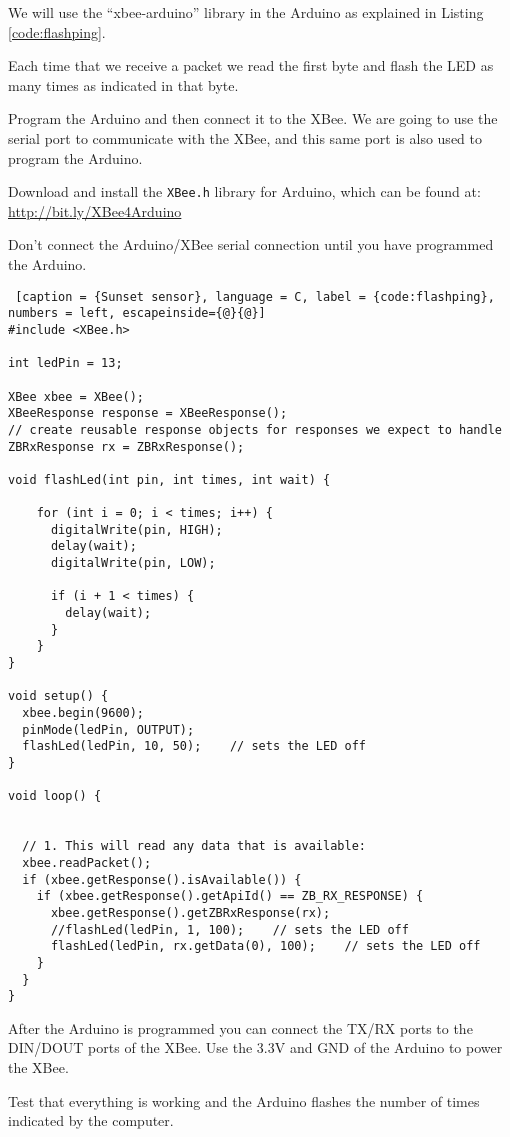 We will use the ``xbee-arduino'' library in the Arduino as explained in Listing \ref{code:flashping}.

Each time that we receive a packet we read the first byte and flash the LED as many times as indicated in that byte.

Program the Arduino and then connect it to the XBee. We are going to use the serial port to communicate with the XBee, and this same port is also used to program the Arduino.

Download and install the \texttt{XBee.h} library for Arduino, which can be found at: \url{http://bit.ly/XBee4Arduino}

Don't connect the Arduino/XBee serial connection until you have programmed the Arduino.

\begin{lstlisting} [caption = {Sunset sensor}, language = C, label = {code:flashping}, numbers = left, escapeinside={@}{@}]
#include <XBee.h>

int ledPin = 13;

XBee xbee = XBee();
XBeeResponse response = XBeeResponse();
// create reusable response objects for responses we expect to handle 
ZBRxResponse rx = ZBRxResponse();

void flashLed(int pin, int times, int wait) {

    for (int i = 0; i < times; i++) {
      digitalWrite(pin, HIGH);
      delay(wait);
      digitalWrite(pin, LOW);

      if (i + 1 < times) {
        delay(wait);
      }
    }
}

void setup() {
  xbee.begin(9600);
  pinMode(ledPin, OUTPUT);
  flashLed(ledPin, 10, 50);    // sets the LED off
}

void loop() {


  // 1. This will read any data that is available:
  xbee.readPacket();
  if (xbee.getResponse().isAvailable()) {
    if (xbee.getResponse().getApiId() == ZB_RX_RESPONSE) {
      xbee.getResponse().getZBRxResponse(rx);
      //flashLed(ledPin, 1, 100);    // sets the LED off
      flashLed(ledPin, rx.getData(0), 100);    // sets the LED off
    }
  }
}
\end{lstlisting}

After the Arduino is programmed you can connect the TX/RX ports to the DIN/DOUT ports of the XBee.
Use the 3.3V and GND of the Arduino to power the XBee.

Test that everything is working and the Arduino flashes the number of times indicated by the computer.

